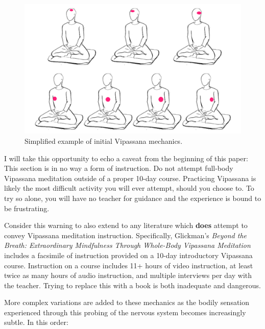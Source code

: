 \documentclass{article}
\begin{document}
\begin{figure}[h]
  \centering
  \includegraphics[width=\linewidth]{images/burmese-vipassana-mechanics.png}
  \caption{Simplified example of initial Vipassana mechanics.}
  \label{fig:vipassana-mechanics}
\end{figure}

I will take this opportunity to echo a caveat from the beginning of this paper: This section is in no way a form of instruction. Do not attempt full-body Vipassana meditation outside of a proper 10-day course. Practicing Vipassana is likely the most difficult activity you will ever attempt, should you choose to. To try so alone, you will have no teacher for guidance and the experience is bound to be frustrating.

Consider this warning to also extend to any literature which \textbf{does} attempt to convey Vipassana meditation instruction. Specifically, Glickman's \textit{Beyond the Breath: Extraordinary Mindfulness Through Whole-Body Vipassana Meditation} \cite{glickman} includes a facsimile of instruction provided on a 10-day introductory Vipassana course. Instruction on a course includes 11+ hours of video instruction, at least twice as many hours of audio instruction, and multiple interviews per day with the teacher. Trying to replace this with a book is both inadequate and dangerous.

More complex variations are added to these mechanics as the bodily sensation experienced through this probing of the nervous system becomes increasingly subtle. In this order:
\end{document}
